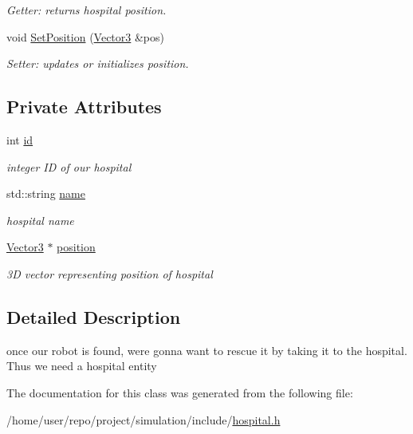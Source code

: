 \begin{DoxyCompactItemize}
\begin{DoxyCompactList}\small\item\em Getter\+: returns hospital position. \end{DoxyCompactList}\item 
\mbox{\label{classHospital_a712a53eb9795a0362c6aa543a49667eb}} 
void \hyperlink{classHospital_a712a53eb9795a0362c6aa543a49667eb}{Set\+Position} (\hyperlink{classVector3}{Vector3} \&pos)
\begin{DoxyCompactList}\small\item\em Setter\+: updates or initializes position. \end{DoxyCompactList}\end{DoxyCompactItemize}
\subsection*{Private Attributes}
\begin{DoxyCompactItemize}
\item 
\mbox{\label{classHospital_ad04682106dbb95ac699a4fc90436db0e}} 
int \hyperlink{classHospital_ad04682106dbb95ac699a4fc90436db0e}{id}
\begin{DoxyCompactList}\small\item\em integer ID of our hospital \end{DoxyCompactList}\item 
\mbox{\label{classHospital_a26fa9b5e5ae30cc8db885c84e02fc2de}} 
std\+::string \hyperlink{classHospital_a26fa9b5e5ae30cc8db885c84e02fc2de}{name}
\begin{DoxyCompactList}\small\item\em hospital name \end{DoxyCompactList}\item 
\mbox{\label{classHospital_ae7d66c3913d623f18bb0dde46a624e61}} 
\hyperlink{classVector3}{Vector3} $\ast$ \hyperlink{classHospital_ae7d66c3913d623f18bb0dde46a624e61}{position}
\begin{DoxyCompactList}\small\item\em 3D vector representing position of hospital \end{DoxyCompactList}\end{DoxyCompactItemize}


\subsection{Detailed Description}
once our robot is found, we\textquotesingle{}re gonna want to rescue it by taking it to the hospital. Thus we need a hospital entity 

The documentation for this class was generated from the following file\+:\begin{DoxyCompactItemize}
\item 
/home/user/repo/project/simulation/include/\hyperlink{hospital_8h}{hospital.\+h}\end{DoxyCompactItemize}
